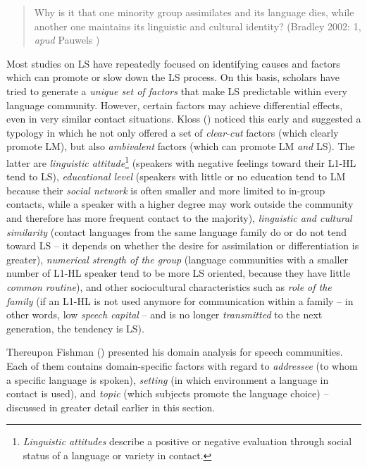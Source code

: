 \documentclass[output=paper,
modfonts
]{langscibook}
\begin{document}
\begin{quote}
Why is it that one minority group assimilates and its language dies, while another one maintains its linguistic and cultural identity? (Bradley 2002: 1, \emph{apud} Pauwels \citeyear[58]{Pauwels2016})
\end{quote}

Most studies on LS have repeatedly focused on identifying causes and factors which can promote or slow down the LS  process. On this basis, scholars have tried to generate a \emph{unique set of factors} that make LS predictable within every language community. However, certain factors may achieve differential effects, even in very similar contact situations. Kloss (\citeyear{Kloss1966})  noticed this early and suggested a typology in which he not only offered a set of \emph{clear-cut} factors (which clearly promote LM), but also \emph{ambivalent} factors (which can promote LM \emph{and} LS). The latter are \emph{linguistic attitude}\footnote{\emph{Linguistic attitudes} describe a positive or negative evaluation through social status of a language or variety in contact.} (speakers with negative feelings toward their L1-HL tend to LS), \emph{educational level} (speakers with little or no education tend to LM because their \emph{social network} is often smaller and more limited to in-group contacts, while a speaker with a higher degree may work outside the community and therefore has more  frequent contact to the majority), \emph{linguistic and cultural similarity} (contact languages from the same language family do or do not tend toward LS -- it depends on whether the desire for assimilation or differentiation is greater), \emph{numerical strength of the group} (language communities with a smaller number of L1-HL speaker tend to be more LS oriented, because they have little \emph{common routine}), and other sociocultural characteristics such as \emph{role of the family} (if an L1-HL is not used anymore for communication within a family -- in other words, low \emph{speech capital} -- and is no longer \emph{transmitted} to the next generation, the tendency is LS).

Thereupon Fishman  (\citeyear{Fishman1972}) presented his domain analysis for speech communities. Each of them contains domain-specific factors with regard to \emph{addressee} (to whom a specific language is spoken), \emph{setting} (in which environment a language in contact is used), and \emph{topic} (which subjects promote the language choice) -- discussed in greater detail earlier in this section. 
\end{document}
